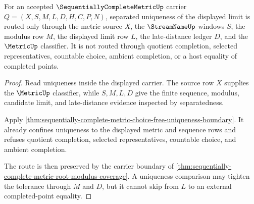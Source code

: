 \begin{theorem}
\label{thm:sequentially-complete-metric-displayed-limit-uniqueness-route}
For an accepted $\SequentiallyCompleteMetricUp$ carrier $Q=(X,S,M,L,D,H,C,P,N)$, separated uniqueness of the displayed limit is routed only through the metric source $X$, the $\StreamNameUp$ windows $S$, the modulus row $M$, the displayed limit row $L$, the late-distance ledger $D$, and the $\MetricUp$ classifier. It is not routed through quotient completion, selected representatives, countable choice, ambient completion, or a host equality of completed points.
\end{theorem}
\begin{proof}
Read uniqueness inside the displayed carrier. The source row $X$ supplies the $\MetricUp$ classifier, while $S,M,L,D$ give the finite sequence, modulus, candidate limit, and late-distance evidence inspected by separatedness.

Apply \autoref{thm:sequentially-complete-metric-choice-free-uniqueness-boundary}. It already confines uniqueness to the displayed metric and sequence rows and refuses quotient completion, selected representatives, countable choice, and ambient completion.

The route is then preserved by the carrier boundary of \autoref{thm:sequentially-complete-metric-root-modulus-coverage}. A uniqueness comparison may tighten the tolerance through $M$ and $D$, but it cannot skip from $L$ to an external completed-point equality.
\end{proof}


